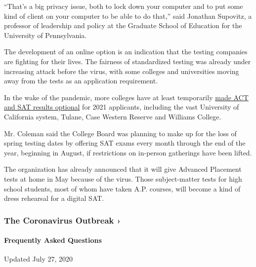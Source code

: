 ``That's a big privacy issue, both to lock down your computer and to put
some kind of client on your computer to be able to do that,'' said
Jonathan Supovitz, a professor of leadership and policy at the Graduate
School of Education for the University of Pennsylvania.

The development of an online option is an indication that the testing
companies are fighting for their lives. The fairness of standardized
testing was already under increasing attack before the virus, with some
colleges and universities moving away from the tests as an application
requirement.

In the wake of the pandemic, more colleges have at least temporarily
\href{https://www.nytimes.com/2020/04/15/us/sat-act-test-optional-colleges-coronavirus.html}{made
ACT and SAT results optional} for 2021 applicants, including the vast
University of California system, Tulane, Case Western Reserve and
Williams College.

Mr. Coleman said the College Board was planning to make up for the loss
of spring testing dates by offering SAT exams every month through the
end of the year, beginning in August, if restrictions on in-person
gatherings have been lifted.

The organization has already announced that it will give Advanced
Placement tests at home in May because of the virus. Those
subject-matter tests for high school students, most of whom have taken
A.P. courses, will become a kind of dress rehearsal for a digital SAT.

\href{https://www.nytimes.com/news-event/coronavirus?action=click\&pgtype=Article\&state=default\&region=MAIN_CONTENT_3\&context=storylines_faq}{}

\hypertarget{the-coronavirus-outbreak-}{%
\subsubsection{The Coronavirus Outbreak
›}\label{the-coronavirus-outbreak-}}

\hypertarget{frequently-asked-questions}{%
\paragraph{Frequently Asked
Questions}\label{frequently-asked-questions}}

Updated July 27, 2020

